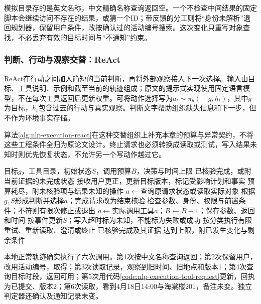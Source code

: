 模拟目录存的是英文名称，中文精确名称查询返回空。一个不检查中间结果的固定脚本会继续访问不存在的结果，或猜一个ID；带反馈的分工则将“身份未解析”退回规划器，保留用户条件，改按确认过的活动编号搜索。这次变化只重写对象查找，不必丢弃有效的目标时间与“不通知”约束。

\subsubsection{判断、行动与观察交替：ReAct}
\label{sec:nlp-execution-react}

ReAct在行动之间加入简短的当前判断，再将外部观察接入下一次选择。输入由目标、工具说明、示例和截至当前的轨迹组成；原文的提示式实现使用固定语言模型，不在每次工具返回后更新权重。可将动作选择写为$a_t\sim\pi_{\theta}(\,\cdot\mid g,h_t)$，其中$g$为目标，$h_t$包含过去的行动与真实观察。判断文字帮助组织缺失信息和下一步，但不作为环境事实存储。

算法\ref{alg:nlp-execution-react}在这种交替组织上补充本章的预算与异常契约，不将这些工程条件全归为原论文设计。终止请求也必须转换成读取或测试，写入结果未知时则优先恢复状态，不允许另一个写动作越过它。

\begin{algorithm}[带预算与结果核验的行动循环]
\label{alg:nlp-execution-react}
\begin{algorithmic}[1]
\Require 目标$g$，工具目录，初始状态$S$，调用预算$B$，决策与时间上限
\Ensure 已核验完成，或附当前证据的未完成状态
  \State 接收用户更正，更新目标版本，标记受影响计划和事实
    \State \Return 预算耗尽，附未核验项与结果未知的操作
  \EndIf
    \State $a\gets$查询原请求状态或读取实际对象
  \Else
    \State 根据$g,S$形成判断并选择$a$；完成请求改为结束核验
  \EndIf
  \State 检查参数、身份、权限与前置条件；不符则有限次修正或退出
  \State $o\gets$实际调用工具$a$；$B\gets B-1$；保存参数、返回和时间
  \State 按事件更新$S$；写入超时标为未知，不能标为失败或成功
    \State 按分类执行有限重试、重新读取、澄清或终止
  \EndIf
    \State \Return 已核验完成及其证据
  \EndIf
\EndWhile
\State \Return 达到上限，附已发生变化与剩余条件
\end{algorithmic}
\end{algorithm}

本地正常轨迹确实执行了六次调用。第1次按中文名称查询返回\code{[]}；第2次保留用户，改用活动编号，取得；第3次读取记录，观察到旧时间、旧地点和版本1；第4次查询目标时段，返回可用；第5次用代码\ref{code:nlp-execution-tool-request}更新，回执为已提交、版本2；第6次读取，看到4月18日14:00与海棠楼201，备注未变。独立判定器还确认及通知记录未变。

